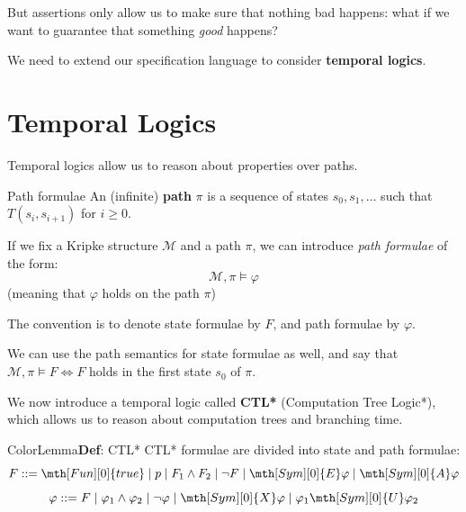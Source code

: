 \documentclass[a4paper, 11pt]{report}
\newcommand{\argdef}[2]{\if&#1&#2\else#1\fi}
\newcommand{\mthstyfun}{0}
\newcommand{\mthfun}[1][]{\mth[Fun][\argdef{#1}{\mthstyfun}]}
\newcommand{\mthstysym}{0}
\newcommand{\mthsym}[1][]{\mth[Sym][\argdef{#1}{\mthstysym}]}
\newcommand{\X}{\mthsym{X}}
\newcommand{\U}{\mthsym{U}}
\newcommand{\E}{\mthsym{E}}
\newcommand{\A}{\mthsym{A}}
\newcommand{\true}{\mthfun{true}}
\begin{document}
But assertions only allow us to make sure that nothing bad happens: what if we want to guarantee that something \textit{good} happens?

We need to extend our specification language to consider \textbf{temporal logics}.

\section{Temporal Logics}
Temporal logics allow us to reason about properties over paths.
\begin{defframe}{Path formulae}{}
    An (infinite) \textbf{path} $\pi$ is a sequence of states $s_{0}, s_{1}, \dots$ such that $T(s_{i}, s_{i+1})$ for $i \geq 0$.

    If we fix a Kripke structure $\mathcal{M}$ and a path $\pi$, we can introduce \textit{path formulae} of the form:
    $$
\mathcal{M}, \pi \vDash \varphi
    $$
    (meaning that $\varphi$ holds on the path $\pi$)

\end{defframe}

The convention is to denote state formulae by $F$, and path formulae by $\varphi$.

We can use the path semantics for state formulae as well, and say that $\mathcal{M}, \pi \vDash F \iff F$ holds in the first state $s_{0}$ of $\pi$.

We now introduce a temporal logic called \textbf{CTL*} (Computation Tree Logic*), which allows us to reason about computation trees and branching time.



\begin{cframe}{ColorLemma}{\textbf{Def}: CTL*}{}
    CTL* formulae are divided into state and path formulae:
    $$F ::= \true \mid p \mid F_1 \land F_2 \mid \neg F \mid \E \varphi \mid \A \varphi$$ 
    $$\varphi ::= F \mid \varphi_1 \land \varphi_2 \mid \neg \varphi \mid \X \varphi \mid \varphi_1 \U \varphi_2$$
\end{cframe}
\end{document}
